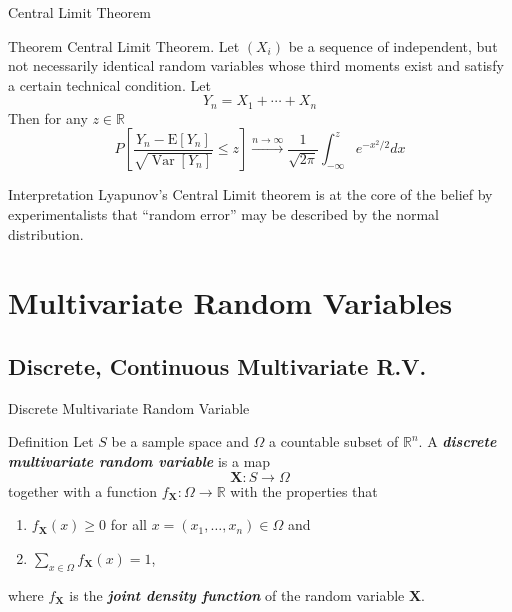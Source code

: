 \documentclass{beamer}
\newcommand{\bb}[1]{\textcolor{antiquefuchsia}{\textbf{\textit{#1}}}}
\begin{document}
\begin{frame}{Central Limit Theorem}
\begin{block}{Theorem}
Central Limit Theorem. Let $\left(X_{i}\right)$ be a sequence of independent, but not necessarily identical random variables whose third moments exist and satisfy a certain technical condition. Let
$$
Y_{n}=X_{1}+\cdots+X_{n}
$$
Then for any $z \in \mathbb{R}$
$$
P\left[\frac{Y_{n}-\mathrm{E}\left[Y_{n}\right]}{\sqrt{\operatorname{Var}\left[Y_{n}\right]}} \leq z\right] \stackrel{n \rightarrow \infty}{\longrightarrow} \frac{1}{\sqrt{2 \pi}} \int_{-\infty}^{z} e^{-x^{2} / 2} d x
$$
\end{block}
\begin{block}{Interpretation}
Lyapunov’s Central Limit theorem is at the core of the belief by
experimentalists that “random error” may be described by the normal
distribution.
\end{block}
\end{frame}


\section{Multivariate Random Variables}
\subsection{Discrete, Continuous Multivariate R.V.}
\begin{frame}{Discrete Multivariate Random Variable}
\begin{block}{Definition}
Let $S$ be a sample space and $\Omega$ a countable subset of $\mathbb{R}^{n}$. A \bb{discrete multivariate random variable} is a map
$$
\mathbf{X}: S \rightarrow \Omega
$$
together with a function $f_{\mathbf{X}}: \Omega \rightarrow \mathbb{R}$ with the properties that
\begin{enumerate}
\item $f_{\mathbf{X}}(x) \geq 0$ for all $x=\left(x_{1}, \ldots, x_{n}\right) \in \Omega$ and
\item $\sum_{x \in \Omega} f_{\mathbf{X}}(x)=1$,
\end{enumerate}
where $f_{\mathbf{X}}$ is the \bb{joint density function} of the random variable $\mathbf{X}$.
\end{block}
\end{frame}
\end{document}

